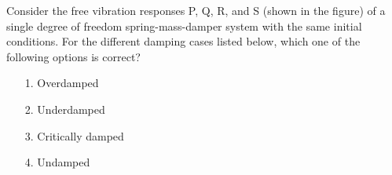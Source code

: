 \iffalse
\title{2024-AE}
\author{EE24BTECH11020  -  Ellanti Rohith}
\section{ae}
\chapter{2024}
\fi


\item Consider the free vibration responses P, Q, R, and S (shown in the figure) of a single degree of freedom spring-mass-damper system with the same initial conditions. For the different damping cases listed below, which one of the following options is correct?
\begin{enumerate}
            \item[1.] Overdamped
            \item[2.] Underdamped
            \item [3.]Critically damped     
            \item[4.] Undamped
        \end{enumerate}

